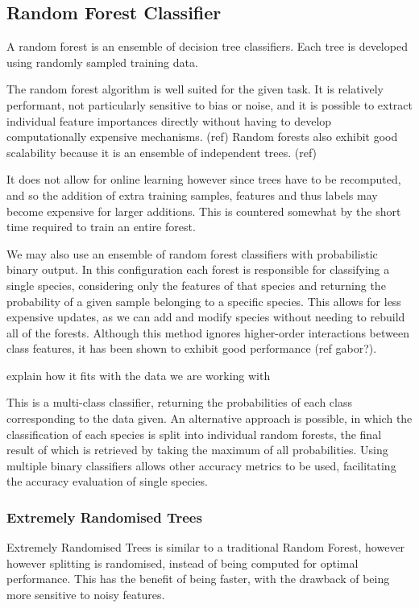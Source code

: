 \subsection{Random Forest Classifier}
A random forest is an ensemble of decision tree classifiers.
Each tree is developed using randomly sampled training data.

The random forest algorithm is well suited for the given task.
It is relatively performant, not particularly sensitive to bias or noise,
and it is possible to extract individual feature importances directly without
having to develop computationally expensive mechanisms. (ref)
Random forests also exhibit good scalability because it is an ensemble of
independent trees. (ref)

It does not allow for online learning however since trees have to be recomputed, 
and so the addition of extra training samples, features and thus labels may
become expensive for larger additions.
This is countered somewhat by the short time required to train an entire forest.

We may also use an ensemble of random forest classifiers with probabilistic
binary output.
In this configuration each forest is responsible for classifying a single
species, considering only the features of that species and returning the
probability of a given sample belonging to a specific species.
This allows for less expensive updates, as we can add and modify species without
needing to rebuild all of the forests.
Although this method ignores higher-order interactions between class features,
it has been shown to exhibit good performance (ref gabor?).


explain how it fits with the data we are working with

This is a multi-class classifier, returning the probabilities of each class
corresponding to the data given.
An alternative approach is possible, in which the classification of each species
is split into individual random forests, the final result of which is retrieved
by taking the maximum of all probabilities.
Using multiple binary classifiers allows other accuracy metrics to be used,
facilitating the accuracy evaluation of single species.

\subsubsection{Extremely Randomised Trees}
Extremely Randomised Trees is similar to a traditional Random Forest, however
however splitting is randomised, instead of being computed for optimal
performance.
This has the benefit of being faster, with the drawback of being more sensitive
to noisy features.\\

